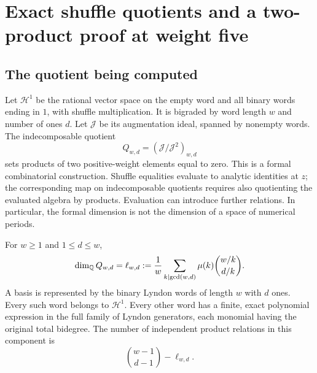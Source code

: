 \section{Exact shuffle quotients and a two-product proof at weight five}
\label{sec:shuffle}

\subsection{The quotient being computed}

Let \(\mathcal H^1\) be the rational vector space on the empty word
and all binary words ending in \(1\), with shuffle multiplication.
It is bigraded by word length \(w\) and number of ones \(d\).
Let \(\mathcal J\) be its augmentation ideal, spanned by nonempty
words. The indecomposable quotient
\[
Q_{w,d}=(\mathcal J/\mathcal J^2)_{w,d}
\]
sets products of two positive-weight elements equal to zero.
This is a formal combinatorial construction. Shuffle equalities evaluate
to analytic identities at \(z\); the corresponding map on indecomposable
quotients requires also quotienting the evaluated algebra by products.
Evaluation can introduce further relations. In particular, the formal
dimension is not the dimension of a space of numerical periods.

\begin{theorem}\label{thm:witt}
For \(w\ge1\) and \(1\le d\le w\),
\[
\dim_{\mathbb Q}Q_{w,d}
=\ell_{w,d}
:=\frac1w\sum_{k\mid\gcd(w,d)}
\mu(k)\binom{w/k}{d/k}.
\]
A basis is represented by the binary Lyndon words of length \(w\)
with \(d\) ones. Every such word belongs to \(\mathcal H^1\).
Every other word has a finite, exact polynomial expression in the full
family of Lyndon generators, each monomial having the original total
bidegree. The number of independent product relations in
this component is
\[
\binom{w-1}{d-1}-\ell_{w,d}.
\]
\end{theorem}

